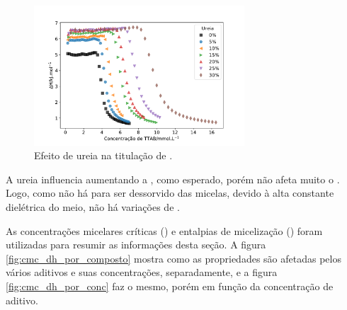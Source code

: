 			\begin{figure}[h]
				\centering
				\includegraphics[width=0.7\textwidth]{imagens/itc/ITC_ur}
				\caption{Efeito de ureia na titulação de \TTAB.}
				\label{fig:itc_ureia}
			\end{figure}
		
		A ureia influencia aumentando a \cmc{}, como esperado, porém não afeta muito o \DHmic{}. Logo, como não há \Sal{} para ser dessorvido das micelas, devido à alta constante dielétrica do meio, não há variações de \DHmic.
		
		As concentrações micelares críticas (\cmc) e entalpias de micelização (\DHmic) foram utilizadas para resumir as informações desta seção. A figura \ref{fig:cmc_dh_por_composto} mostra como as propriedades são afetadas pelos vários aditivos e suas concentrações, separadamente, e a figura \ref{fig:cmc_dh_por_conc} faz o mesmo, porém em função da concentração de aditivo.
		
